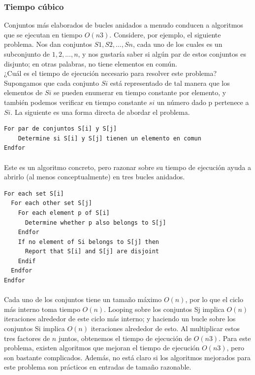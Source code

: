 \documentclass[a4paper]{article}
\begin{document}
\subsubsection*{Tiempo cúbico} 

Conjuntos más elaborados de bucles anidados a menudo conducen a algoritmos que se ejecutan en tiempo $O(n3)$. Considere, por ejemplo, el siguiente problema. Nos dan conjuntos $S1, S2, ..., Sn$, cada uno de los cuales es un subconjunto de ${1, 2,. . . , n}$, y nos gustaría saber si algún par de estos conjuntos es disjunto; en otras palabras, no tiene elementos en común.\\

¿Cuál es el tiempo de ejecución necesario para resolver este problema? Supongamos que cada conjunto $Si$ está representado de tal manera que los elementos de $Si$ se pueden enumerar en tiempo constante por elemento, y también podemos verificar en tiempo constante $si$ un número dado p pertenece a $Si$. La siguiente es una forma directa de abordar el problema.\\


\begin{lstlisting}
For par de conjuntos S[i] y S[j]
    Determine si S[i] y S[j] tienen un elemento en comun
Endfor
\end{lstlisting}
\paragraph{}
Este es un algoritmo concreto, pero razonar sobre su tiempo de ejecución ayuda a
abrirlo (al menos conceptualmente) en tres bucles anidados.\\

\begin{lstlisting}
For each set S[i]
  For each other set S[j]
    For each element p of S[i]
      Determine whether p also belongs to S[j]
    Endfor
    If no element of Si belongs to S[j] then
      Report that S[i] and S[j] are disjoint
    Endif
  Endfor
Endfor
\end{lstlisting}
\paragraph{}
Cada uno de los conjuntos tiene un tamaño máximo $O(n)$, por lo que el ciclo más interno toma tiempo $O(n)$. Looping sobre los conjuntos Sj implica $O(n)$ iteraciones alrededor de este ciclo más interno; y haciendo un bucle sobre los conjuntos Si implica $O(n)$ iteraciones alrededor de esto. Al multiplicar estos tres factores de $n$ juntos, obtenemos el tiempo de ejecución de $O(n3)$. Para este problema, existen algoritmos que mejoran el tiempo de ejecución $O(n3)$, pero son bastante complicados. Además, no está claro si los algoritmos mejorados para este problema son prácticos en entradas de tamaño razonable.\\
\end{document}
